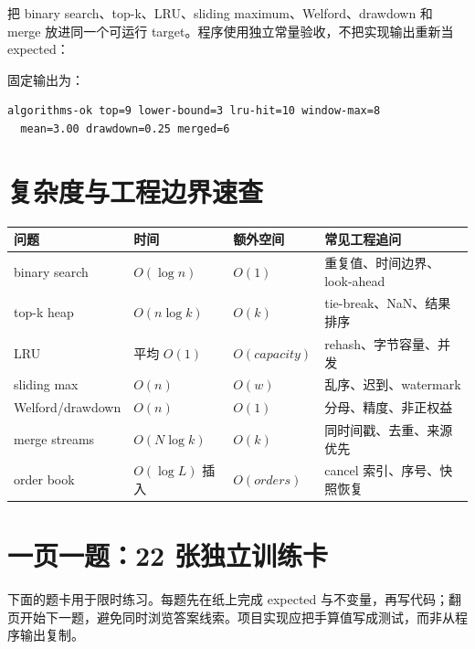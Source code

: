  把 binary search、top-k、LRU、sliding maximum、Welford、drawdown 和 merge 放进同一个可运行 target。程序使用独立常量验收，不把实现输出重新当 expected：



固定输出为：

\begin{lstlisting}[numbers=none]
algorithms-ok top=9 lower-bound=3 lru-hit=10 window-max=8
  mean=3.00 drawdown=0.25 merged=6
\end{lstlisting}

\section{复杂度与工程边界速查}

\begin{center}
\small
\begin{tabularx}{\textwidth}{p{}p{}p{}X}
\toprule
问题 & 时间 & 额外空间 & 常见工程追问 \\
\midrule
binary search & \(O(\log n)\) & \(O(1)\) & 重复值、时间边界、look-ahead \\
top-k heap & \(O(n\log k)\) & \(O(k)\) & tie-break、NaN、结果排序 \\
LRU & 平均 \(O(1)\) & \(O(capacity)\) & rehash、字节容量、并发 \\
sliding max & \(O(n)\) & \(O(w)\) & 乱序、迟到、watermark \\
Welford/drawdown & \(O(n)\) & \(O(1)\) & 分母、精度、非正权益 \\
merge streams & \(O(N\log k)\) & \(O(k)\) & 同时间戳、去重、来源优先 \\
order book & \(O(\log L)\) 插入 & \(O(orders)\) & cancel 索引、序号、快照恢复 \\
\bottomrule
\end{tabularx}
\end{center}

\section{一页一题：22 张独立训练卡}

下面的题卡用于限时练习。每题先在纸上完成 expected 与不变量，再写代码；翻页开始下一题，避免同时浏览答案线索。项目实现应把手算值写成测试，而非从程序输出复制。

\newcommand{\algorithmdrill}[5]{%
  \clearpage
  \subsection{#1}
  \textbf{题面：}#2

  \textbf{手算基准：}#3

  \textbf{循环不变量与复杂度：}#4

  \textbf{工程追问：}#5
  \vfill
  \noindent\rule{\textwidth}{0.3pt}
  \textit{作答记录：接口、边界、失败政策、核心状态与一次反例。}
}

